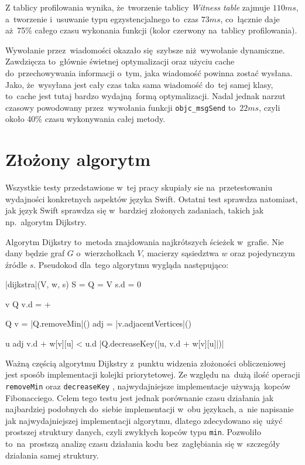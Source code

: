 \documentclass[mgr, shortabstract]{iithesis}
\newcommand{\swiftinline}[1]{
    \texttt{#1}
}
\newcommand{\objcinline}[1]{
    \texttt{#1}
}
\begin{document}
Z tablicy profilowania wynika, że~tworzenie tablicy \textit{Witness table} zajmuje $110ms$, a~tworzenie i~usuwanie typu egzystencjalnego to~czas $73ms$, co~łącznie daje aż~75\% całego czasu wykonania funkcji (kolor czerwony na~tablicy profilowania).

Wywołanie przez~wiadomości okazało się szybsze niż wywołanie dynamiczne. Zawdzięcza to~głównie świetnej optymalizacji oraz użyciu cache do~przechowywania informacji o~tym, jaka wiadomość powinna zostać wysłana. Jako, że~wysyłana jest cały czas taka sama wiadomość do~tej samej klasy, to~cache jest tutaj bardzo wydajną formą optymalizacji. Nadal jednak narzut czasowy powodowany przez~wywołania funkcji \objcinline{objc_msgSend} to~$22ms$, czyli około 40\% czasu wykonywania całej metody.

\section{Złożony algorytm}

Wszystkie testy przedstawione w~tej pracy skupiały sie na~przetestowaniu wydajności konkretnych aspektów języka Swift. Ostatni test sprawdza natomiast, jak język Swift sprawdza się w~bardziej złożonych zadaniach, takich jak np.~algorytm Dijkstry.

Algorytm Dijkstry to~metoda znajdowania najkrótszych ścieżek w~grafie. Nie dany będzie graf $G$ o~wierzchołkach $V$, macierzy sąsiedztwa $w$ oraz pojedynczym źródle $s$. Pseudokod dla~tego algorytmu wygląda następująco:

\begin{algorithm}
\begin{program}
    \PROC |dijkstra|(V, w, s)
        S = \emptyset {}
        Q = V 
        s.d = 0

        \FOR v \in Q \DO
            v.d = +\infty
        \END

        \WHILE Q \neq \emptyset
            v = |Q.removeMin|()
            adj = |v.adjacentVertices|()

            \FOR u \in adj \DO
                \IF v.d + w[v][u] < u.d
                    \THEN |Q.decreaseKey(|u, v.d + w[v][u]|)|
                \FI
            \END
        \END
\end{program}
\end{algorithm}

Ważną częścią algorytmu Dijkstry z~punktu widzenia złożoności obliczeniowej jest sposób implementacji kolejki priorytetowej. Ze względu na~dużą ilość operacji \swiftinline{removeMin} oraz \swiftinline{decreaseKey}, najwydajniejsze implementacje używają kopców Fibonacciego. Celem tego testu jest jednak porównanie czasu działania jak najbardziej podobnych do~siebie implementacji w~obu językach, a~nie napisanie jak najwydajniejszej implementacji algorytmu, dlatego zdecydowano się użyć prostszej struktury danych, czyli zwykłych kopców typu \texttt{min}. Pozwoliło to~na~prostszą analizę czasu działania kodu bez~zagłębiania się w~szczegóły działania samej struktury.
\end{document}
